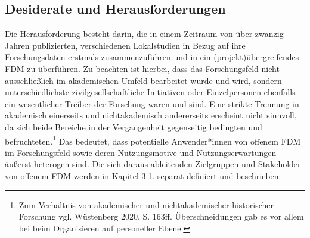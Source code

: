 \subsection{Desiderate und Herausforderungen}
Die Herausforderung besteht darin, die in einem Zeitraum von über zwanzig Jahren publizierten, verschiedenen Lokalstudien in Bezug auf ihre Forschungsdaten erstmals zusammenzuführen und in ein (projekt)übergreifendes FDM zu überführen. Zu beachten ist hierbei, dass das Forschungsfeld nicht ausschließlich im akademischen Umfeld bearbeitet wurde und wird, sondern unterschiedlichste zivilgesellschaftliche Initiativen oder Einzelpersonen ebenfalls ein wesentlicher Treiber der Forschung waren und sind. Eine strikte Trennung in akademisch einerseits und nichtakademisch andererseits erscheint nicht sinnvoll, da sich beide Bereiche in der Vergangenheit gegenseitig bedingten und befruchteten.\footnote{Zum Verhältnis von akademischer und nichtakademischer historischer Forschung vgl. Wüstenberg 2020, S. 163ff. Überschneidungen gab es vor allem bei beim Organisieren auf personeller Ebene.} Das bedeutet, dass potentielle Anwender*innen von offenem FDM im Forschungsfeld sowie deren Nutzungsmotive und Nutzungserwartungen äußerst heterogen sind. Die sich daraus ableitenden Zielgruppen und Stakeholder von offenem FDM werden in Kapitel 3.1. separat definiert und beschrieben.

